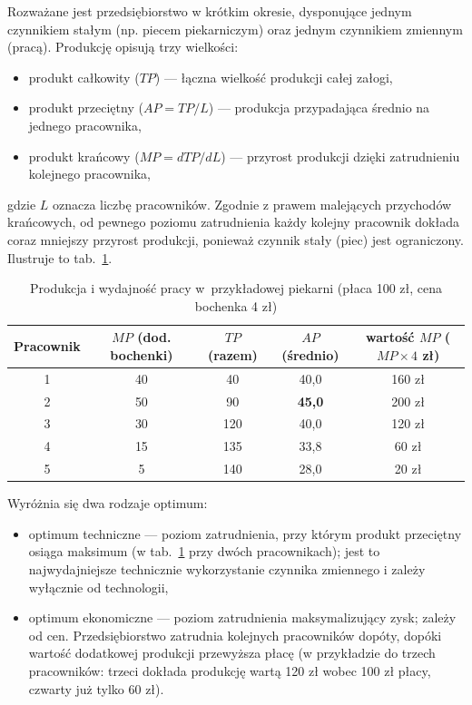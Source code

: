 Rozważane jest przedsiębiorstwo w krótkim okresie, dysponujące jednym czynnikiem stałym (np. piecem piekarniczym) oraz jednym czynnikiem zmiennym (pracą). Produkcję opisują trzy wielkości:
\begin{itemize}
  \item produkt całkowity ($TP$) --- łączna wielkość produkcji całej załogi,
  \item produkt przeciętny ($AP=TP/L$) --- produkcja przypadająca średnio na jednego pracownika,
  \item produkt krańcowy ($MP=dTP/dL$) --- przyrost produkcji dzięki zatrudnieniu kolejnego pracownika,
\end{itemize}
gdzie $L$ oznacza liczbę pracowników. Zgodnie z prawem malejących przychodów krańcowych, od pewnego poziomu zatrudnienia każdy kolejny pracownik dokłada coraz mniejszy przyrost produkcji, ponieważ czynnik stały (piec) jest ograniczony. Ilustruje to tab.~\ref{tab:piekarnia}.

\begin{table}[h]
\centering
\caption{Produkcja i wydajność pracy w~przykładowej piekarni (płaca 100 zł, cena bochenka 4 zł)}
\label{tab:piekarnia}
\footnotesize
\begin{tabular}{@{}ccccc@{}}
\toprule
Pracownik & \makecell{$MP$\\(dod. bochenki)} & \makecell{$TP$\\(razem)} & \makecell{$AP$\\(średnio)} & \makecell{wartość $MP$\\($MP\times 4$ zł)} \\
\midrule
1 & 40 & 40  & 40{,}0 & 160 zł \\
2 & 50 & 90  & \textbf{45{,}0} & 200 zł \\
3 & 30 & 120 & 40{,}0 & 120 zł \\
4 & 15 & 135 & 33{,}8 & 60 zł  \\
5 & 5  & 140 & 28{,}0 & 20 zł  \\
\bottomrule
\end{tabular}
\zrodlo
\end{table}

Wyróżnia się dwa rodzaje optimum:
\begin{itemize}
  \item optimum techniczne --- poziom zatrudnienia, przy którym produkt przeciętny osiąga maksimum (w tab.~\ref{tab:piekarnia} przy dwóch pracownikach); jest to najwydajniejsze technicznie wykorzystanie czynnika zmiennego i zależy wyłącznie od technologii,
  \item optimum ekonomiczne --- poziom zatrudnienia maksymalizujący zysk; zależy od cen. Przedsiębiorstwo zatrudnia kolejnych pracowników dopóty, dopóki wartość dodatkowej produkcji przewyższa płacę (w przykładzie do trzech pracowników: trzeci dokłada produkcję wartą 120 zł wobec 100 zł płacy, czwarty już tylko 60 zł).
\end{itemize}


